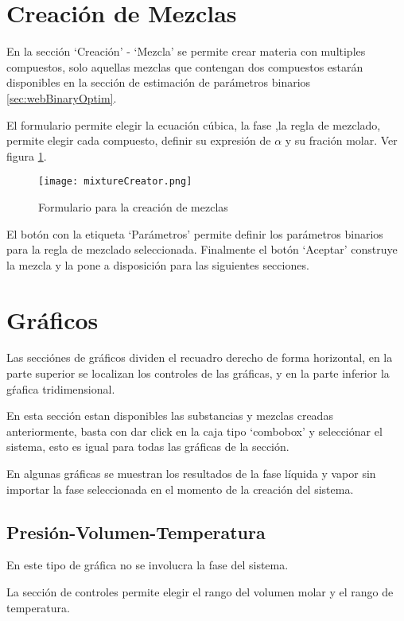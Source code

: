 \section{Creación de Mezclas}\label{sec:webMixtureCreator}

	En la sección `Creación' - `Mezcla' se permite crear materia con multiples compuestos, solo aquellas mezclas que contengan dos compuestos estarán disponibles en la sección de estimación de parámetros binarios \ref{sec:webBinaryOptim}.

	El formulario permite elegir la ecuación cúbica, la fase ,la regla de mezclado, permite elegir cada compuesto, definir su expresión de $\alpha$ y su fración molar. Ver figura \ref{fig:webMixCreator}.

	\begin{figure}[!h]
		\texttt{[image: mixtureCreator.png]}
		\caption{Formulario para la creación de mezclas}
		\label{fig:webMixCreator}
	\end{figure}

	El botón con la etiqueta `Parámetros' permite definir los parámetros binarios para la regla de mezclado seleccionada. Finalmente el botón `Aceptar' construye la mezcla y la pone a disposición para las siguientes secciones.

\section{Gráficos}

	Las secciónes de gráficos dividen el recuadro derecho de forma horizontal, en la parte superior se localizan los controles de las gráficas, y en la parte inferior la gŕafica tridimensional.

	En esta sección estan disponibles las substancias y mezclas creadas anteriormente, basta con dar click en la caja tipo `combobox' y selecciónar el sistema, esto es igual para todas las gráficas de la sección.

	En algunas gráficas se muestran los resultados de la fase líquida y vapor sin importar la fase seleccionada en el momento de la creación del sistema.

	\subsection{Presión-Volumen-Temperatura}\label{subsec:pvt}
		En este tipo de gráfica no se involucra la fase del sistema. 

		La sección de controles permite elegir el rango del volumen molar y el rango de temperatura.
		
